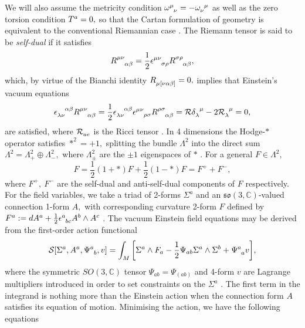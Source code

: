 \documentclass[a4paper,12pt, onecolumn, notitlepage]{article}
\theoremstyle{definition}
\theoremstyle{remark}
\newcommand{\al}{\alpha}
\newcommand{\w}{\omega}
\newcommand{\m}{\mu}
\newcommand{\n}{\nu}
\newcommand{\e}{\epsilon}
\begin{document}
We will also assume the metricity condition $\w\indices{^\m_\n}=-\w\indices{_\n^\m}$ as well as the zero torsion condition $T\indices{^a}=0,$ so that the Cartan formulation of geometry is equivalent to the conventional Riemannian case \cite{eguchi_1980}. The Riemann tensor is said to be \emph{self-dual} if it satisfies
\begin{equation*}
	R\indices{^\m^\n_\al_\beta} = \frac{1}{2}\e\indices{^\m^\n_\sigma_\rho}R\indices{^\sigma^\rho_\al_\beta},
\end{equation*}
which, by virtue of the Bianchi identity $R\indices{_\m_{[\n\al\beta]}}=0,$ implies that Einstein's vacuum equations
\begin{equation*}
	\e\indices{_{\lambda\n}^{\al\beta}}R\indices{^{\m\n}_{\al\beta}}=\frac{1}{2}\e\indices{_{\lambda\n}^{\al\beta}}\e\indices{^{\m\n}_{\rho\sigma}}R\indices{^{\rho\sigma}_{\al\beta}}= \mathcal{R}\delta\indices{_{\lambda}^\m}-2\mathcal{R}\indices{_\lambda^\m}=0,
\end{equation*}
are satisfied, where $\mathcal{R}\indices{_{ae}}$ is the Ricci tensor \cite{eguchi_1980}. In 4 dimensions the Hodge-$\ast$ operator satisfies $\ast^{2}=+1,$ splitting the bundle $\Lambda^{2}$ into the direct sum $\Lambda^{2}=\Lambda^{2}_{+}\oplus\Lambda^{2}_{-},$ where $\Lambda^{2}_{\pm}$ are the $\pm 1$ eigenspaces of $\ast$ \cite{atiyah_1978}. For a general $F\in\Lambda^{2},$
\begin{equation*}
	F = \frac{1}{2}(1+\ast)F + \frac{1}{2}(1-\ast)F = F^{+} + F^{-},
\end{equation*}
where $F^{+},\ F^{-}$ are the self-dual and anti-self-dual components of $F$ respectively.\\
For the field variables, we take a triad of 2-forms $\Sigma^{a}$ and an $\mathfrak{so}(3,\mathbb{C})$-valued connection 1-form $A,$ with corresponding curvature 2-form $F$ defined by $F\indices{^a}:=dA\indices{^a}+\frac{1}{2}\e\indices{^a_b_c}A\indices{^b}\wedge A\indices{^c}$ \cite{capovilla_1989}.
The vacuum Einstein field equations may be derived from the first-order action functional
\begin{equation}
\label{action}
\mathcal{S}[\Sigma^{a}, A^{a}, \Psi\indices{^a_b}, v] = \int_{M}\bigg[\Sigma^{a}\wedge F_{a} - \frac{1}{2}\Psi_{ab}\Sigma^{a}\wedge\Sigma^{b} + \Psi\indices{^a_a}v\bigg],
\end{equation}
where the symmetric $SO(3,\mathbb{C})$ tensor $\Psi_{ab}=\Psi_{(ab)}$ and 4-form $v$ are Lagrange multipliers introduced in order to set constraints on the $\Sigma^{a}$ \cite{capovilla_1989}. The first term in the integrand is nothing more than the Einstein action when the connection form $A$ satisfies its equation of motion. Minimising the action, we have the following equations
\end{document}
